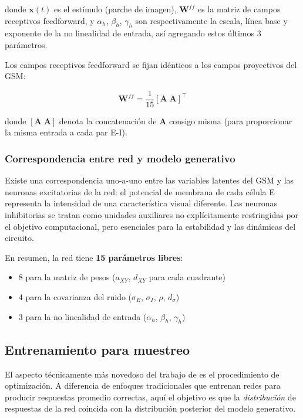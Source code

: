donde $\mathbf{x}(t)$ es el estímulo (parche de imagen), $\mathbf{W}^{ff}$ es la matriz de campos receptivos feedforward, y $\alpha_h$, $\beta_h$, $\gamma_h$ son respectivamente la escala, línea base y exponente de la no linealidad de entrada, así agregando estos últimos 3 parámetros.

Los campos receptivos feedforward se fijan idénticos a los campos proyectivos del \acrshort{GSM}:

\begin{equation}
\mathbf{W}^{ff} = \frac{1}{15} [\mathbf{A} \; \mathbf{A}]^\top
\label{eq:feedforward_weights}
\end{equation}

donde $[\mathbf{A} \; \mathbf{A}]$ denota la concatenación de $\mathbf{A}$ consigo misma (para proporcionar la misma entrada a cada par E-I).

\subsubsection{Correspondencia entre red y modelo generativo}

Existe una correspondencia uno-a-uno entre las variables latentes del \acrshort{GSM} y las neuronas excitatorias de la red: el potencial de membrana de cada célula E representa la intensidad de una característica visual diferente. Las neuronas inhibitorias se tratan como unidades auxiliares no explícitamente restringidas por el objetivo computacional, pero esenciales para la estabilidad y las dinámicas del circuito.

En resumen, la red tiene \textbf{15 parámetros libres}:
\begin{itemize}
    \item 8 para la matriz de pesos ($a_{XY}$, $d_{XY}$ para cada cuadrante)
    \item 4 para la covarianza del ruido ($\sigma_E$, $\sigma_I$, $\rho$, $d_\sigma$)
    \item 3 para la no linealidad de entrada ($\alpha_h$, $\beta_h$, $\gamma_h$)
\end{itemize}

\subsection{Entrenamiento para muestreo}
\label{subsec:echeveste_entrenamiento}

El aspecto técnicamente más novedoso del trabajo de \citeauthor{echeveste2020cortical} es el procedimiento de optimización. A diferencia de enfoques tradicionales que entrenan redes para producir respuestas promedio correctas, aquí el objetivo es que la \textit{distribución} de respuestas de la red coincida con la distribución posterior del modelo generativo.

